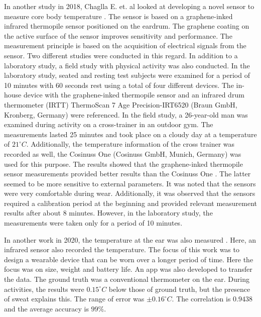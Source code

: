 In another study in 2018, Chaglla E. et. al looked at developing a novel sensor to measure core body temperature \cite{chagllae.MeasurementCoreBody2018}. 
The sensor is based on a graphene-inked infrared thermopile sensor positioned on the eardrum. 
The graphene coating on the active surface of the sensor improves sensitivity and performance. 
The measurement principle is based on the acquisition of electrical signals from the sensor.
Two different studies were conducted in this regard. 
In addition to a laboratory study, a field study with physical activity was also conducted.
In the laboratory study, seated and resting test subjects were examined for a period of 10 minutes with 60 seconds rest using a total of four different devices. 
The in-house device with the graphene-inked thermopile sensor and an infrared drum thermometer (IRTT) ThermoScan 7 Age Precision-IRT6520 (Braun GmbH, Kronberg, Germany) were referenced.
In the field study, a 26-year-old man was examined during activity on a cross-trainer in an outdoor gym. The measurements lasted 25 minutes and took place on a cloudy day at a temperature of $21^\circ C$. 
Additionally, the temperature information of the cross trainer was recorded as well, the Cosinuss One (Cosinuss GmbH, Munich, Germany) was used for this purpose.
The results showed that the graphene-inked thermopile sensor measurements provided better results than the Cosinuss One \cite{chagllae.MeasurementCoreBody2018}. 
The latter seemed to be more sensitive to external parameters. 
It was noted that the sensors were very comfortable during wear. 
Additionally, it was observed that the sensors required a calibration period at the beginning and provided relevant measurement results after about 8 minutes. 
However, in the laboratory study, the measurements were taken only for a period of 10 minutes.

In another work in 2020, the temperature at the ear was also measured \cite{chenInearThermometerWearable2020}.
Here, an infrared sensor also recorded the temperature. 
The focus of this work was to design a wearable device that can be worn over a longer period of time. 
Here the focus was on size, weight and battery life.
An app was also developed to transfer the data.
The ground truth was a conventional thermometer on the ear.
During activities, the results were $0.15^\circ C$ below those of ground truth, but the presence of sweat explains this.
The range of error was $\pm 0.16 ^\circ C$.
The correlation is $0.9438$ and the average accuracy is $99\%$.

